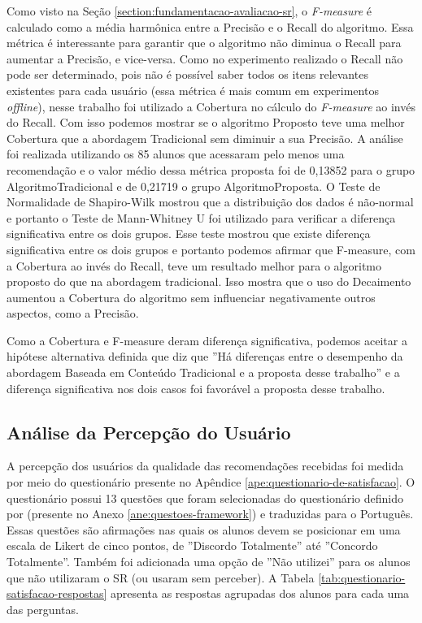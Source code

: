 Como visto na Seção \ref{section:fundamentacao-avaliacao-sr}, o \textit{F-measure} é calculado como a média harmônica entre
a Precisão e o Recall do algoritmo. Essa métrica é interessante para garantir que o algoritmo não diminua o Recall
para aumentar a Precisão, e vice-versa. Como no experimento realizado o Recall não pode ser determinado, pois não
é possível saber todos os itens relevantes existentes para cada usuário (essa métrica é mais comum em experimentos
\textit{offline}), nesse trabalho foi utilizado a Cobertura no cálculo do \textit{F-measure} ao invés do Recall.
Com isso podemos mostrar se o algoritmo Proposto teve uma melhor Cobertura que a abordagem Tradicional sem diminuir
a sua Precisão. A análise foi realizada utilizando os 85 alunos que acessaram pelo menos uma recomendação e o valor médio
dessa métrica proposta foi de 0,13852 para o grupo AlgoritmoTradicional e de 0,21719 o grupo AlgoritmoProposta.
O Teste de Normalidade de Shapiro-Wilk mostrou que a distribuição dos dados é não-normal e portanto o Teste de
Mann-Whitney U foi utilizado para verificar a diferença significativa entre os dois grupos. Esse teste mostrou que
existe diferença significativa entre os dois grupos e portanto podemos afirmar que F-measure, com a Cobertura ao invés
do Recall, teve um resultado melhor para o algoritmo proposto do que na abordagem tradicional. Isso mostra
que o uso do Decaimento aumentou a Cobertura do algoritmo sem influenciar negativamente outros aspectos, como a Precisão.

Como a Cobertura e F-measure deram diferença significativa, podemos aceitar a hipótese alternativa definida
que diz que ''Há diferenças entre o desempenho da abordagem Baseada em Conteúdo Tradicional e a proposta desse trabalho''
e a diferença significativa nos dois casos foi favorável a proposta desse trabalho.

\subsection{Análise da Percepção do Usuário}\label{subsection:analise-questionario-satisfacao}

A percepção dos usuários da qualidade das recomendações recebidas foi medida por meio do questionário presente no
Apêndice \ref{ape:questionario-de-satisfacao}. O questionário possui 13 questões que foram selecionadas do questionário
definido por  (presente no Anexo \ref{ane:questoes-framework}) e traduzidas para o Português.
Essas questões são afirmações nas quais os alunos devem se posicionar em uma escala de
Likert de cinco pontos, de ''Discordo Totalmente'' até ''Concordo Totalmente''. Também foi adicionada uma opção de ''Não utilizei'' para
os alunos que não utilizaram o SR (ou usaram sem perceber). A Tabela \ref{tab:questionario-satisfacao-respostas}
apresenta as respostas agrupadas dos alunos para cada uma das perguntas.


